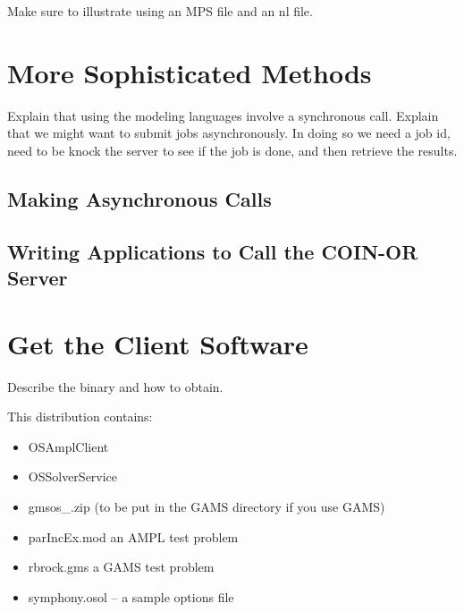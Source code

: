 \documentclass[11pt]{article}
\renewcommand{\{}{{\char"7B}}
\renewcommand{\}}{{\char"7D}}
\renewcommand{\^}{{\char"0D}}
\renewcommand{\'}{{\char"0D}}
\begin{document}
Make sure to illustrate using an MPS file and an nl file. 



\section{More Sophisticated Methods}\label{section:sophisticated}

Explain that using the modeling languages involve a synchronous call. Explain that we might want to submit jobs asynchronously. In doing so we need a job id, need to be knock the server to see if the job is done, and then retrieve the results. 

\subsection{Making Asynchronous Calls}\label{section:async}

\subsection{Writing Applications to Call  the COIN-OR Server}\label{section:applications}


\section{Get the Client Software}\label{section:binary}

Describe the binary and how to obtain.

This distribution contains:

\begin{itemize}

\item OSAmplClient

\item OSSolverService

\item gmsos\_.zip (to be put in the GAMS directory if you use GAMS)

\item parIncEx.mod an AMPL test problem

\item rbrock.gms a GAMS  test problem

\item symphony.osol -- a sample options file





\end{itemize}
\end{document}
